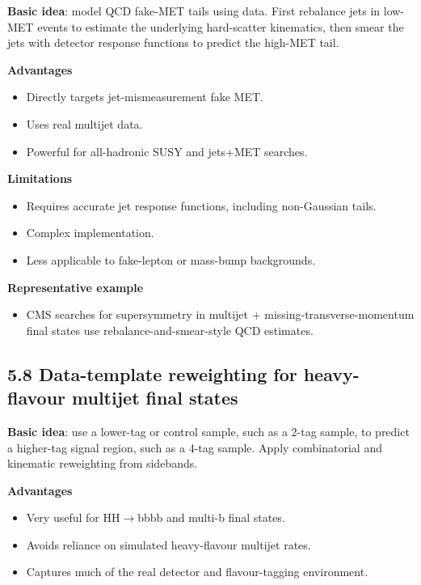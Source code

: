 \documentclass[11pt]{article}
\begin{document}
\textbf{Basic idea}: model QCD fake-MET tails using data. First rebalance jets in low-MET events to estimate the underlying hard-scatter kinematics, then smear the jets with detector response functions to predict the high-MET tail.

\textbf{Advantages}

\begin{itemize}
\item Directly targets jet-mismeasurement fake MET.
\item Uses real multijet data.
\item Powerful for all-hadronic SUSY and jets+MET searches.
\end{itemize}

\textbf{Limitations}

\begin{itemize}
\item Requires accurate jet response functions, including non-Gaussian tails.
\item Complex implementation.
\item Less applicable to fake-lepton or mass-bump backgrounds.
\end{itemize}

\textbf{Representative example}

\begin{itemize}
\item CMS searches for supersymmetry in multijet + missing-transverse-momentum final states use rebalance-and-smear-style QCD estimates.
\end{itemize}

\subsection{5.8 Data-template reweighting for heavy-flavour multijet final states}

\textbf{Basic idea}: use a lower-tag or control sample, such as a 2-tag sample, to predict a higher-tag signal region, such as a 4-tag sample. Apply combinatorial and kinematic reweighting from sidebands.

\textbf{Advantages}

\begin{itemize}
\item Very useful for HH$\to$bbbb and multi-b final states.
\item Avoids reliance on simulated heavy-flavour multijet rates.
\item Captures much of the real detector and flavour-tagging environment.
\end{itemize}
\end{document}
